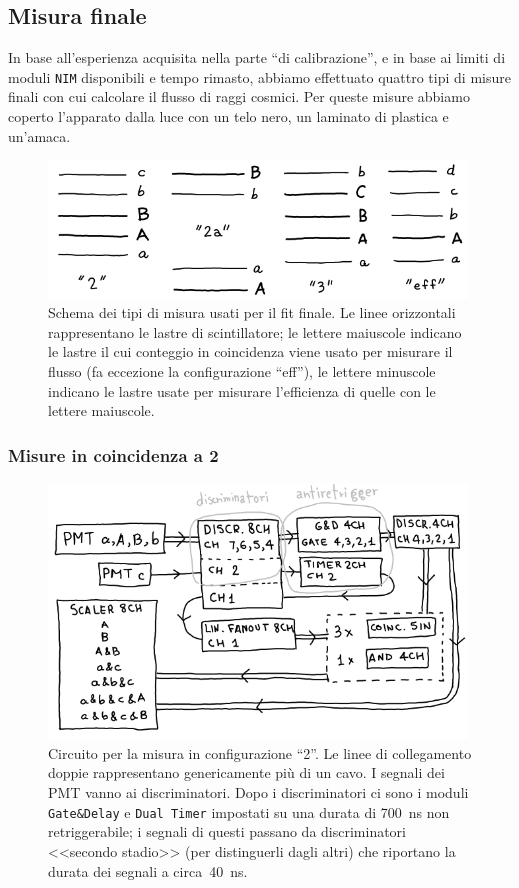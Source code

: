 \subsection{Misura finale}

In base all'esperienza acquisita nella parte ``di calibrazione'',
e in base ai limiti di moduli \texttt{NIM} disponibili e tempo rimasto,
abbiamo effettuato quattro tipi di misure finali con cui calcolare il flusso di raggi cosmici.
Per queste misure abbiamo coperto l'apparato dalla luce
con un telo nero, un laminato di plastica e un'amaca.

\begin{figure}
	\centering
	\includegraphics[width=30em]{modmisfinale}
	\caption{\label{fig:modmisfinale}
	Schema dei tipi di misura usati per il fit finale.
	Le linee orizzontali rappresentano le lastre di scintillatore;
	le lettere maiuscole indicano le lastre il cui conteggio in coincidenza
	viene usato per misurare il flusso (fa eccezione la configurazione ``eff''),
	le lettere minuscole indicano le lastre usate per misurare l'efficienza
	di quelle con le lettere maiuscole.}
\end{figure}

\subsubsection{Misure in coincidenza a 2}

\begin{figure}
	\centering
	\includegraphics[width=30em]{circuitomisdue}
	\caption{\label{fig:circuitomisdue}
	Circuito per la misura in configurazione ``2''.
	Le linee di collegamento doppie rappresentano genericamente più di un cavo.
	I segnali dei PMT vanno ai discriminatori.
	Dopo i discriminatori ci sono i moduli \texttt{Gate\&Delay} e \texttt{Dual Timer}
	impostati su una durata di \SI{700}{ns} non retriggerabile;
	i segnali di questi passano da discriminatori <<secondo stadio>> (per distinguerli dagli altri)
	che riportano la durata dei segnali a circa~\SI{40}{ns}.}
\end{figure}

